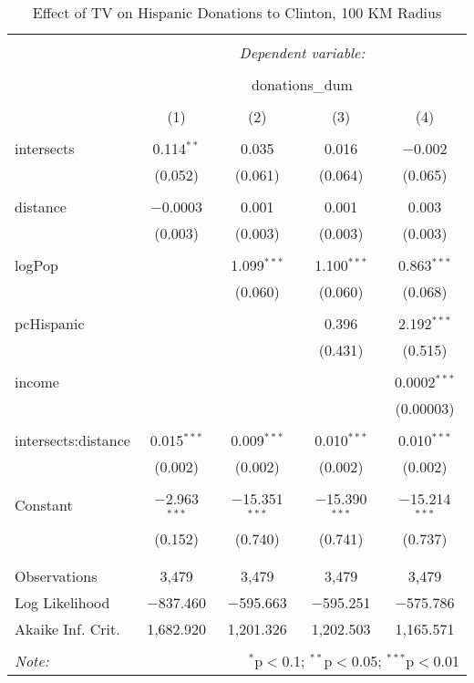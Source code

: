 
\begin{table}[!htbp] \centering 
  \caption{Effect of TV on Hispanic Donations to Clinton, 100 KM Radius} 
  \label{} 
\begin{tabular}{@{\extracolsep{-5pt}}lcccc} 
\\[-1.8ex]\hline 
\hline \\[-1.8ex] 
 & \multicolumn{4}{c}{\textit{Dependent variable:}} \\ 
\cline{2-5} 
\\[-1.8ex] & \multicolumn{4}{c}{donations\_dum} \\ 
\\[-1.8ex] & (1) & (2) & (3) & (4)\\ 
\hline \\[-1.8ex] 
 intersects & 0.114$^{**}$ & 0.035 & 0.016 & $-$0.002 \\ 
  & (0.052) & (0.061) & (0.064) & (0.065) \\ 
  & & & & \\ 
 distance & $-$0.0003 & 0.001 & 0.001 & 0.003 \\ 
  & (0.003) & (0.003) & (0.003) & (0.003) \\ 
  & & & & \\ 
 logPop &  & 1.099$^{***}$ & 1.100$^{***}$ & 0.863$^{***}$ \\ 
  &  & (0.060) & (0.060) & (0.068) \\ 
  & & & & \\ 
 pcHispanic &  &  & 0.396 & 2.192$^{***}$ \\ 
  &  &  & (0.431) & (0.515) \\ 
  & & & & \\ 
 income &  &  &  & 0.0002$^{***}$ \\ 
  &  &  &  & (0.00003) \\ 
  & & & & \\ 
 intersects:distance & 0.015$^{***}$ & 0.009$^{***}$ & 0.010$^{***}$ & 0.010$^{***}$ \\ 
  & (0.002) & (0.002) & (0.002) & (0.002) \\ 
  & & & & \\ 
 Constant & $-$2.963$^{***}$ & $-$15.351$^{***}$ & $-$15.390$^{***}$ & $-$15.214$^{***}$ \\ 
  & (0.152) & (0.740) & (0.741) & (0.737) \\ 
  & & & & \\ 
\hline \\[-1.8ex] 
Observations & 3,479 & 3,479 & 3,479 & 3,479 \\ 
Log Likelihood & $-$837.460 & $-$595.663 & $-$595.251 & $-$575.786 \\ 
Akaike Inf. Crit. & 1,682.920 & 1,201.326 & 1,202.503 & 1,165.571 \\ 
\hline 
\hline \\[-1.8ex] 
\textit{Note:}  & \multicolumn{4}{r}{$^{*}$p$<$0.1; $^{**}$p$<$0.05; $^{***}$p$<$0.01} \\ 
\end{tabular} 
\end{table} 
